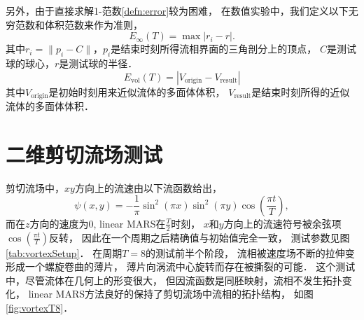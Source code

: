 另外，由于直接求解1-范数\eqref{defn:error}较为困难，
在数值实验中，我们定义以下无穷范数和体积范数来作为准则，
\begin{equation}
E_{\infty}(T)=\max| r_i-r|.
\end{equation}
其中$r_i=\|p_i-C\|$，$p_i$是结束时刻所得流相界面的三角剖分上的顶点，
$C$是测试球的球心，$r$是测试球的半径．
\begin{equation}
E_{\mathrm{vol}}(T)=|V_{\mathrm{origin}}-V_{\mathrm{result}}|
\end{equation}
其中$V_{\mathrm{origin}}$是初始时刻用来近似流体的多面体体积，
$V_{\mathrm{result}}$是结束时刻所得的近似流体的多面体体积．



\section{二维剪切流场测试}
剪切流场中，$xy$方向上的流速由以下流函数给出，
\begin{equation*}
\psi (x,y)=-\frac{1}{\pi}\sin^2(\pi x)\sin^2(\pi y)\cos(\frac{\pi t}{T}),
\end{equation*}
而在$z$方向的速度为$0$, linear MARS在$\frac{T}{2}$时刻，
$x$和$y$方向上的流速符号被余弦项$\cos(\frac{\pi  t}{T})$反转，
因此在一个周期之后精确值与初始值完全一致，
测试参数见图\ref{tab:vortexSetup}．
在周期$T=8$的测试前半个阶段，
流相被速度场不断的拉伸变形成一个螺旋卷曲的薄片，
薄片向涡流中心旋转而存在被撕裂的可能．
这个测试中，尽管流体在几何上的形变很大，
但因流函数是同胚映射，流相不发生拓扑变化，
linear MARS方法良好的保持了剪切流场中流相的拓扑结构，
如图\ref{fig:vortexT8}．


